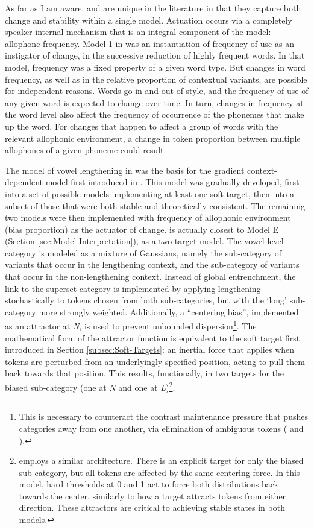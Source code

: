 As far as I am aware, \citet{soskuthy2013phonetic} and \citet{Soskuthy2015}
are unique in the literature in that they capture both change and
stability within a single model. Actuation occurs via a completely
speaker-internal mechanism that is an integral component of the model:
allophone frequency. Model 1 in 
was an instantiation of frequency of use as an instigator of change,
in the successive reduction of highly frequent words. In that model,
frequency was a fixed property of a given word type. But changes in
word frequency, as well as in the relative proportion of contextual
variants, are possible for independent reasons. Words go in and out
of style, and the frequency of use of any given word is expected to
change over time. In turn, changes in frequency at the word level
also affect the frequency of occurrence of the phonemes that make
up the word. For changes that happen to affect a group of words with
the relevant allophonic environment, a change in token proportion
between multiple allophones of a given phoneme could result. 

The model of vowel lengthening in \citet{soskuthy2013phonetic} was
the basis for the gradient context-dependent model first introduced
in . This model was
gradually developed, first into a set of possible models implementing
at least one soft target, then into a subset of those that were both
stable and theoretically consistent. The remaining two models were
then implemented with frequency of allophonic environment (bias proportion)
as the actuator of change. \citet{soskuthy2013phonetic} is actually
closest to Model E (Section \ref{sec:Model-Interpretation}), as a
two-target  model. The vowel-level category is modeled
as a mixture of Gaussians, namely the sub-category of variants that
occur in the lengthening context, and the sub-category of variants
that occur in the non-lengthening context. Instead of global entrenchment,
the link to the superset category is implemented by applying lengthening
stochastically to tokens chosen from both sub-categories, but with
the `long' sub-category more strongly weighted. Additionally, a “centering
bias”, implemented as an attractor at \emph{N}, is used to prevent
unbounded dispersion\footnote{This is necessary to counteract the contrast maintenance pressure
that pushes categories away from one another, via elimination of ambiguous
tokens (\citet{Wedel2008} and \citet{Blevins2009}). }. The mathematical form of the attractor function is equivalent to
the soft target first introduced in Section \ref{subsec:Soft-Targets}:
an inertial force that applies when tokens are perturbed from an underlyingly
specified position, acting to pull them back towards that position.
This results, functionally, in two targets for the biased sub-category
(one at \emph{N} and one at \emph{L})\footnote{\citet{Soskuthy2015} employs a similar architecture. There is an
explicit target for only the biased sub-category, but all tokens are
affected by the same centering force. In this model, hard thresholds
at 0 and 1 act to force both distributions back towards the center,
similarly to how a target attracts tokens from either direction. These
attractors are critical to achieving stable states in both models.}. 


